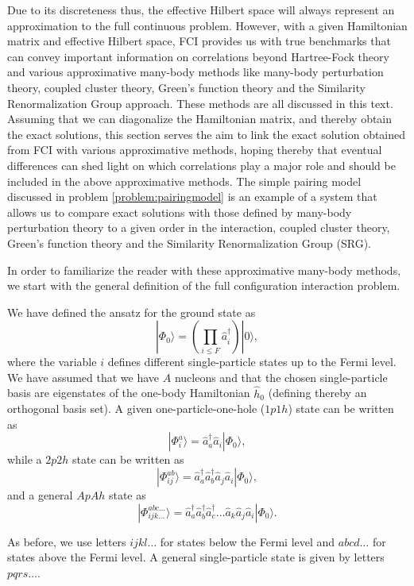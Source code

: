  Due to its discreteness thus, the effective Hilbert space will
  always represent an approximation to the full continuous problem.
  However, with a given Hamiltonian matrix and effective Hilbert
  space, FCI provides us with true benchmarks that can convey
  important information on correlations beyond Hartree-Fock theory and
  various approximative many-body methods like many-body perturbation
  theory, coupled cluster theory, Green's function theory and the
  Similarity Renormalization Group approach. These methods are all
  discussed in this text.  Assuming that we can diagonalize the
  Hamiltonian matrix, and thereby obtain the exact solutions, this
  section serves the aim to link the exact solution obtained from FCI with various
  approximative methods, hoping thereby that eventual differences can
  shed light on which correlations  play a major role and should be
  included in the above approximative methods. The simple pairing
  model discussed in problem \ref{problem:pairingmodel} is an example
  of a system that allows us to compare exact solutions with
  those defined by many-body perturbation theory to a given order in
  the interaction, coupled cluster theory, Green's function theory and
  the Similarity Renormalization Group (SRG). 

  In order to familiarize the reader with these approximative
  many-body methods, we start with the general definition of the full
  configuration interaction problem.

  We have defined the ansatz for the ground state as
  \[
  |\Phi_0\rangle = \left(\prod_{i\le
    F}\hat{a}_{i}^{\dagger}\right)|0\rangle,
  \]
  where the variable  $i$ defines different single-particle states up to
  the Fermi level. We have assumed that we have $A$ nucleons and that the chosen single-particle basis are eigenstates of 
the one-body Hamiltonian $\hat{h}_0$ (defining thereby an orthogonal basis set).  
A given
  one-particle-one-hole ($1p1h$) state can be written as
  \[
  |\Phi_i^a\rangle = \hat{a}_{a}^{\dagger}\hat{a}_i|\Phi_0\rangle,
  \]
  while a $2p2h$ state can be written as
  \[
  |\Phi_{ij}^{ab}\rangle =
  \hat{a}_{a}^{\dagger}\hat{a}_{b}^{\dagger}\hat{a}_j\hat{a}_i|\Phi_0\rangle,
  \]
  and a general $ApAh$ state as
  \[
  |\Phi_{ijk\dots}^{abc\dots}\rangle =
  \hat{a}_{a}^{\dagger}\hat{a}_{b}^{\dagger}\hat{a}_{c}^{\dagger}\dots\hat{a}_k\hat{a}_j\hat{a}_i|\Phi_0\rangle.
  \]

  As before, we use letters $ijkl\dots$ for states below the Fermi level and
  $abcd\dots$ for states above the Fermi level. A general
  single-particle state is given by letters $pqrs\dots$.

